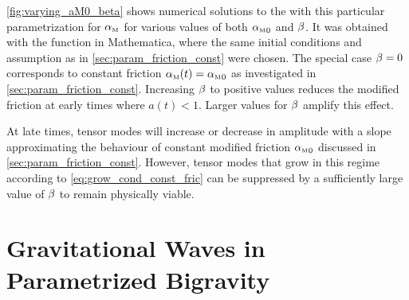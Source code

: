 \autoref{fig:varying_aM0_beta} shows numerical solutions to the  with this particular parametrization for \({\alpha_{\textnormal{\tiny{M}}}}\) for various values of both \({\alpha_{\textnormal{\tiny{M}}}}_0\) and \(\beta\). It was obtained with the  function in Mathematica, where the same initial conditions and assumption as in \autoref{sec:param_friction_const} were chosen. The special case \(\beta=0\) corresponds to constant friction \({\alpha_{\textnormal{\tiny{M}}}}(t)={\alpha_{\textnormal{\tiny{M}}}}_0\) as investigated in \autoref{sec:param_friction_const}. Increasing \(\beta\) to positive values reduces the modified friction at early times where \(a(t) < 1\). Larger values for \(\beta\) amplify this effect.


At late times, tensor modes will increase or decrease in amplitude with a slope approximating the behaviour of constant modified friction \({\alpha_{\textnormal{\tiny{M}}}}_0\) discussed in \autoref{sec:param_friction_const}. However, tensor modes that grow in this regime according to \eqref{eq:grow_cond_const_fric} can be suppressed by a sufficiently large value of \(\beta\) to remain physically viable.



\cleardoublepage
\chapter{Gravitational Waves in Parametrized Bigravity}\label{ch:param_bigravity}

